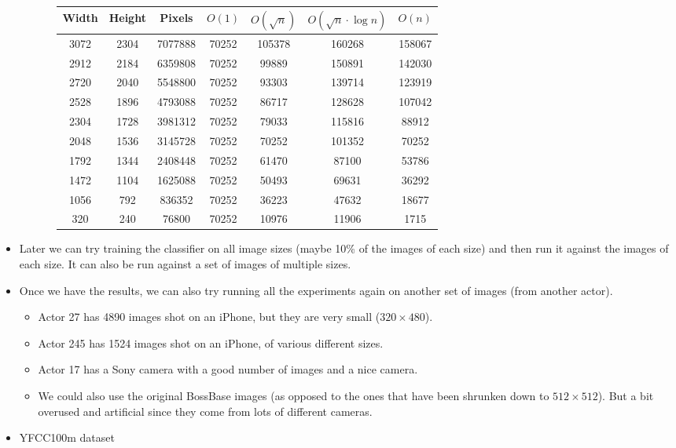 \documentclass[11pt,a4paper]{report}
\begin{document}
\begin{itemize}
\begin{itemize}
\begin{itemize}
\begin{center}
\begin{tabular}{ c c c | c c c c }
            Width & Height & Pixels & $O(1)$ & $O(\sqrt{n})$ & $O(\sqrt{n} \cdot \log n)$ & $O(n)$ \\ \hline
            3072 & 2304 & 7077888 & 70252 & 105378 & 160268 & 158067 \\
            2912 & 2184 & 6359808 & 70252 & 99889 & 150891 & 142030 \\
            2720 & 2040 & 5548800 & 70252 & 93303 & 139714 & 123919 \\
            2528 & 1896 & 4793088 & 70252 & 86717 & 128628 & 107042 \\
            2304 & 1728 & 3981312 & 70252 & 79033 & 115816 & 88912 \\
            2048 & 1536 & 3145728 & 70252 & 70252 & 101352 & 70252 \\
            1792 & 1344 & 2408448 & 70252 & 61470 & 87100 & 53786 \\
            1472 & 1104 & 1625088 & 70252 & 50493 & 69631 & 36292 \\
            1056 & 792 & 836352 & 70252 & 36223 & 47632 & 18677 \\
            320 & 240 & 76800 & 70252 & 10976 & 11906 & 1715 \\
            \end{tabular}
          \end{center}
        \end{itemize}
    \end{itemize}

\item Later we can try training the classifier on all image sizes (maybe 10\% of the images of each size) and then run it against the images of each size. It can also be run against a set of images of multiple sizes.

\item Once we have the results, we can also try running all the experiments again on another set of images (from another actor).
  \begin{itemize}
    \item Actor 27 has 4890 images shot on an iPhone, but they are very small ($320 \times 480$).
    \item Actor 245 has 1524 images shot on an iPhone, of various different sizes.
    \item Actor 17 has a Sony camera with a good number of images and a nice camera.
    \item We could also use the original BossBase images (as opposed to the ones that have been shrunken down to $512 \times 512$). But a bit overused and artificial since they come from lots of different cameras.
  \end{itemize}

\item YFCC100m dataset

\end{itemize}
\end{document}
